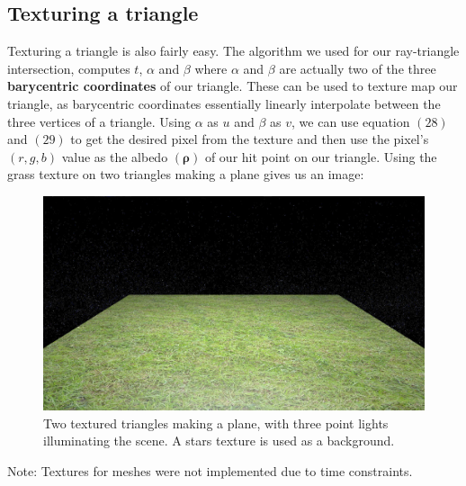 \documentclass[11pt,a4paper]{article}
\begin{document}
	\subsection{Texturing a triangle}
	Texturing a triangle is also fairly easy. The algorithm we used for our ray-triangle intersection, computes $t$, $\alpha$ and $\beta$ where $\alpha$ and $\beta$ are actually two of the three \textbf{barycentric coordinates} of our triangle. These can be used to texture map our triangle, as barycentric coordinates essentially linearly interpolate between the three vertices of a triangle. Using $\alpha$ as $u$ and $\beta$ as $v$, we can use equation $(28)$ and $(29)$ to get the desired pixel from the texture and then use the pixel's $(r, g, b)$ value as the albedo $(\boldsymbol{\rho})$ of our hit point on our triangle. Using the grass texture on two triangles making a plane gives us an image:
	\begin{figure}[H]
		\centering
		\captionsetup{justification=centering}
		\includegraphics[width=.5\textwidth]{textured_triangles.png}\quad
		\caption{Two textured triangles making a plane, with three point lights illuminating the scene. A stars texture is used as a background.}
	\end{figure}

	\noindent
	Note: Textures for meshes were not implemented due to time constraints.
\end{document}
